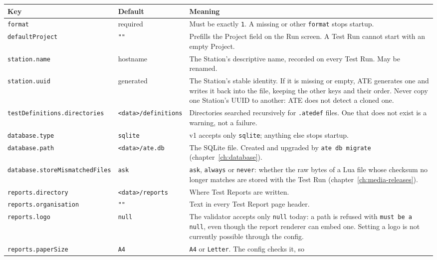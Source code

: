 \begingroup\footnotesize
\begin{longtable}{@{}>{\raggedright\arraybackslash}p{4.4cm}>{\raggedright\arraybackslash}p{3.0cm}>{\raggedright\arraybackslash}p{8.0cm}@{}}
\toprule
Key & Default & Meaning \\
\midrule
\endhead
\texttt{format} & required & Must be exactly \texttt{1}. A missing or other \texttt{format} stops
  startup. \\
\texttt{defaultProject} & \texttt{""} & Prefills the Project field on the Run screen. A Test Run
  cannot start with an empty Project. \\
\texttt{station.name} & hostname & The Station's descriptive name, recorded on every Test Run. May
  be renamed. \\
\texttt{station.uuid} & generated & The Station's stable identity. If it is missing or empty, ATE
  generates one and writes it back into the file, keeping the other keys and their order. Never copy
  one Station's UUID to another: ATE does not detect a cloned one. \\
\texttt{testDefinitions.}\allowbreak\texttt{directories} & \texttt{<data>/}\allowbreak\texttt{definitions} & Directories searched
  recursively for \texttt{.atedef} files. One that does not exist is a warning, not a failure. \\
\texttt{database.type} & \texttt{sqlite} & v1 accepts only \texttt{sqlite}; anything else stops
  startup. \\
\texttt{database.path} & \texttt{<data>/ate.db} & The SQLite file. Created and upgraded by
  \texttt{ate db migrate} (chapter~\ref{ch:database}). \\
\texttt{database.}\allowbreak\texttt{storeMismatchedFiles} & \texttt{ask} & \texttt{ask}, \texttt{always} or
  \texttt{never}: whether the raw bytes of a Lua file whose checksum no longer matches are stored
  with the Test Run (chapter~\ref{ch:media-releases}). \\
\texttt{reports.directory} & \texttt{<data>/reports} & Where Test Reports are written. \\
\texttt{reports.organisation} & \texttt{""} & Text in every Test Report page header. \\
\texttt{reports.logo} & \texttt{null} & The validator accepts only \texttt{null} today: a path is
  refused with \texttt{must be a null}, even though the report renderer can embed one. Setting a
  logo is not currently possible through the config. \\
\texttt{reports.paperSize} & \texttt{A4} & \texttt{A4} or \texttt{Letter}. The config checks it, so

\end{longtable}
